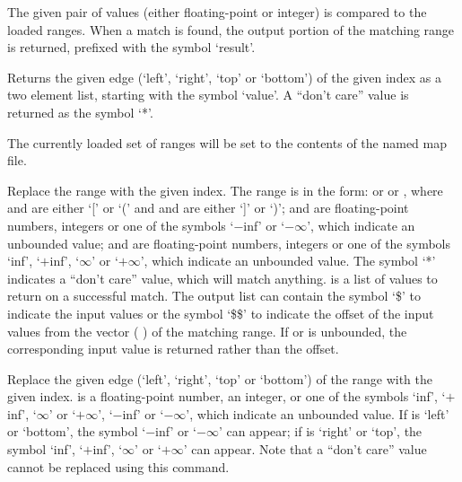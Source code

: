   The given pair of values (either floating-point or integer) is compared to the loaded ranges.
  When a match is found, the output portion of the matching range is returned, prefixed with the symbol
  `result'.
  
  Returns the given edge (`left', `right', `top' or `bottom') of the given index as a two element list,
  starting with the symbol `value'.
  A ``don't care'' value is returned as the symbol `*'.

  The currently loaded set of ranges will be set to the contents of the named map file.
  
  Replace the range with the given index.
  The range is in the form:  or   or , where
   and  are either `[' or `(' and  and  are
  either `]' or `)';
   and  are floating-point numbers, integers or one of the symbols `$-$inf' or
  `$-\infty$', which indicate an unbounded value;
   and  are floating-point numbers, integers or one of the symbols `inf', `$+$inf',
  `$\infty$' or `$+\infty$', which indicate an unbounded value.
  The symbol `*' indicates a ``don't care'' value, which will match anything.
   is a list of values to return on a successful match.
  The output list can contain the symbol `\$' to indicate the input values or the symbol `\$\$' to
  indicate the offset of the input values from the vector ( ) of the matching range.
  If  or  is unbounded, the corresponding input value is returned rather than the offset.

  Replace the given edge (`left', `right', `top' or `bottom') of the range with the
  given index.
   is a floating-point number, an integer, or one of the symbols `inf', `$+$inf',
  `$\infty$' or `$+\infty$', `$-$inf' or `$-\infty$', which indicate an unbounded value.
  If  is `left' or `bottom', the symbol `$-$inf' or `$-\infty$' can appear;
  if  is `right' or `top', the symbol `inf', `$+$inf', `$\infty$' or `$+\infty$' can appear.
  Note that a ``don't care'' value cannot be replaced using this command.

